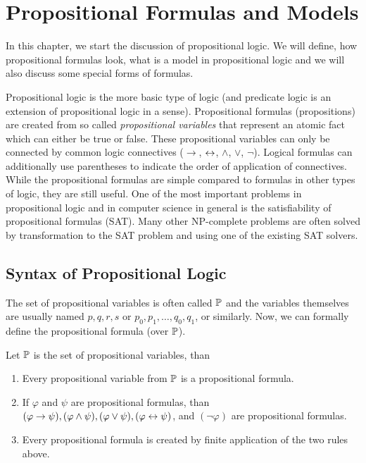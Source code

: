 
\chapter{Propositional Formulas and Models}

In this chapter, we start the discussion of propositional logic. We will define, how propositional formulas look, what is a model in propositional logic and we will also discuss some special forms of formulas.

Propositional logic is the more basic type of logic (and predicate logic is an extension of propositional logic in a sense).  Propositional formulas (propositions) are created from so called \emph{propositional variables} that represent an atomic fact which can either be true or false. These propositional variables can only be connected by common logic connectives ($\to$, $\leftrightarrow$, $\land$, $\lor$, $\neg$). Logical formulas can additionally use parentheses to indicate the order of application of connectives. While the propositional formulas are simple compared to formulas in other types of logic, they are still useful. One of the most important problems in propositional logic and in computer science in general is the satisfiability of propositional formulas (SAT). Many other NP-complete problems are often solved by transformation to the SAT problem and using one of the existing SAT solvers.

\section{Syntax of Propositional Logic}

The set of propositional variables is often called $\mathbb{P}$ and the variables themselves are usually named $p, q, r, s$ or $p_0, p_1, \dots, q_0, q_1$, or similarly. Now, we can formally define the propositional formula (over $\mathbb{P}$).

\begin{definition}
Let $\mathbb{P}$ is the set of propositional variables, than
\begin{enumerate}
  \item Every propositional variable from $\mathbb{P}$ is a propositional formula.
  \item If $\varphi$ and $\psi$ are propositional formulas, than $(\varphi \to \psi), (\varphi \land \psi), (\varphi \lor \psi), (\varphi \leftrightarrow \psi)$, and $(\neg \varphi)$ are propositional formulas.
  \item Every propositional formula is created by finite application of the two rules above.
\end{enumerate}
\end{definition}

